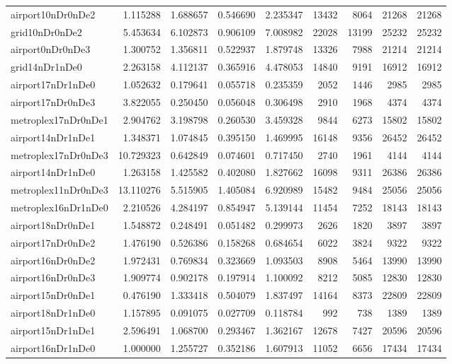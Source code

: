 \begin{longtable}{|l|r|r|r|r|r|r|r|r|}
airport10nDr0nDe2 & 1.115288 & 1.688657 & 0.546690 & 2.235347 & 13432 & 8064 & 21268 & 21268 \\
grid10nDr0nDe2 & 5.453634 & 6.102873 & 0.906109 & 7.008982 & 22028 & 13199 & 25232 & 25232 \\
airport0nDr0nDe3 & 1.300752 & 1.356811 & 0.522937 & 1.879748 & 13326 & 7988 & 21214 & 21214 \\
grid14nDr1nDe0 & 2.263158 & 4.112137 & 0.365916 & 4.478053 & 14840 & 9191 & 16912 & 16912 \\
airport17nDr1nDe0 & 1.052632 & 0.179641 & 0.055718 & 0.235359 & 2052 & 1446 & 2985 & 2985 \\
airport17nDr0nDe3 & 3.822055 & 0.250450 & 0.056048 & 0.306498 & 2910 & 1968 & 4374 & 4374 \\
metroplex17nDr0nDe1 & 2.904762 & 3.198798 & 0.260530 & 3.459328 & 9844 & 6273 & 15802 & 15802 \\
airport14nDr1nDe1 & 1.348371 & 1.074845 & 0.395150 & 1.469995 & 16148 & 9356 & 26452 & 26452 \\
metroplex17nDr0nDe3 & 10.729323 & 0.642849 & 0.074601 & 0.717450 & 2740 & 1961 & 4144 & 4144 \\
airport14nDr1nDe0 & 1.263158 & 1.425582 & 0.402080 & 1.827662 & 16098 & 9311 & 26386 & 26386 \\
metroplex11nDr0nDe3 & 13.110276 & 5.515905 & 1.405084 & 6.920989 & 15482 & 9484 & 25056 & 25056 \\
metroplex16nDr1nDe0 & 2.210526 & 4.284197 & 0.854947 & 5.139144 & 11454 & 7252 & 18143 & 18143 \\
airport18nDr0nDe1 & 1.548872 & 0.248491 & 0.051482 & 0.299973 & 2626 & 1820 & 3897 & 3897 \\
airport17nDr0nDe2 & 1.476190 & 0.526386 & 0.158268 & 0.684654 & 6022 & 3824 & 9322 & 9322 \\
airport16nDr0nDe2 & 1.972431 & 0.769834 & 0.323669 & 1.093503 & 8908 & 5464 & 13990 & 13990 \\
airport16nDr0nDe3 & 1.909774 & 0.902178 & 0.197914 & 1.100092 & 8212 & 5085 & 12830 & 12830 \\
airport15nDr0nDe1 & 0.476190 & 1.333418 & 0.504079 & 1.837497 & 14164 & 8373 & 22809 & 22809 \\
airport18nDr1nDe0 & 1.157895 & 0.091075 & 0.027709 & 0.118784 & 992 & 738 & 1389 & 1389 \\
airport15nDr1nDe1 & 2.596491 & 1.068700 & 0.293467 & 1.362167 & 12678 & 7427 & 20596 & 20596 \\
airport16nDr1nDe0 & 1.000000 & 1.255727 & 0.352186 & 1.607913 & 11052 & 6656 & 17434 & 17434 \\

\end{longtable}
